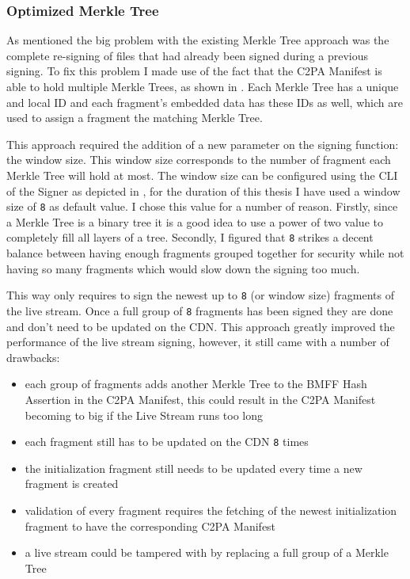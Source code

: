 \subsubsection{Optimized Merkle Tree}

As mentioned the big problem with the existing Merkle Tree approach was the complete re-signing of files that had already been signed during a previous signing. To fix this problem I made use of the fact that the C2PA Manifest is able to hold multiple Merkle Trees, as shown in . Each Merkle Tree has a unique and local ID and each fragment's embedded data has these IDs as well, which are used to assign a fragment the matching Merkle Tree.

This approach required the addition of a new parameter on the signing function: the window size. This window size corresponds to the number of fragment each Merkle Tree will hold at most. The window size can be configured using the CLI of the Signer as depicted in , for the duration of this thesis I have used a window size of \texttt{8} as default value. I chose this value for a number of reason. Firstly, since a Merkle Tree is a binary tree it is a good idea to use a power of two value to completely fill all layers of a tree. Secondly, I figured that \texttt{8} strikes a decent balance between having enough fragments grouped together for security while not having so many fragments which would slow down the signing too much.

This way only requires to sign the newest up to \texttt{8} (or window size) fragments of the live stream. Once a full group of \texttt{8} fragments has been signed they are done and don't need to be updated on the CDN. This approach greatly improved the performance of the live stream signing, however, it still came with a number of drawbacks:

\begin{itemize}
    \item each group of fragments adds another Merkle Tree to the BMFF Hash Assertion in the C2PA Manifest, this could result in the C2PA Manifest becoming to big if the Live Stream runs too long
    \item each fragment still has to be updated on the CDN \texttt{8} times
    \item the initialization fragment still needs to be updated every time a new fragment is created
    \item validation of every fragment requires the fetching of the newest initialization fragment to have the corresponding C2PA Manifest
    \item a live stream could be tampered with by replacing a full group of a Merkle Tree
\end{itemize}

